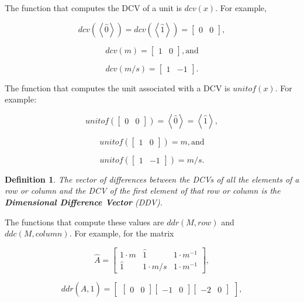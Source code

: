 \documentclass[10pt,letterpaper]{article}
\newtheorem{defn}{Definition}[section]
\numberwithin{equation}{section}
\begin{document}
The function that computes the DCV of a unit is $dcv(x)$.  For example,

\[ dcv(\left\langle\hat 0 \right\rangle) = dcv(\left\langle\hat 1 \right\rangle) = \left[ \begin{matrix} 0 & 0 \end{matrix} \right] , \]

\[ dcv(m) = \left[ \begin{matrix} 1 & 0 \end{matrix} \right] , \mbox{and} \]

\[ dcv(m/s) = \left[ \begin{matrix} 1 & -1 \end{matrix} \right] . \]

The function that computes the unit associated with a DCV is $unitof(x)$.  For example:

\[  unitof(\left[ \begin{matrix} 0 & 0 \end{matrix} \right]) = \left\langle\hat 0 \right\rangle = \left\langle\hat 1 \right\rangle , \]

\[ unitof(\left[ \begin{matrix} 1 & 0 \end{matrix} \right]) = m, \mbox{and} \]

\[ unitof(\left[ \begin{matrix} 1 & -1 \end{matrix} \right]) = m/s. \]

\begin{defn}The vector of differences between the DCVs of all the elements of a row or column and the DCV of the first element of that row or column is the \textbf{Dimensional Difference Vector} (DDV).\end{defn}

The functions that compute these values are $ddr(M, row)$ and $ddc(M, column)$.  For example, for the matrix

\[ \hat A = \left[ \begin{matrix} 
  1 \cdot m & \hat 1 & 1 \cdot m^{-1} \\
  \hat 1 & 1 \cdot m/s & 1 \cdot m^{-1}
 \end{matrix} \right] , \]

\[ ddr(\hat A, 1) = \left[ \begin{matrix} \left[ \begin{matrix} 0 & 0 \end{matrix} \right] \left[ \begin{matrix} -1 & 0 \end{matrix} \right] \left[ \begin{matrix} -2 & 0 \end{matrix} \right] \end{matrix} \right] , \]
\end{document}
